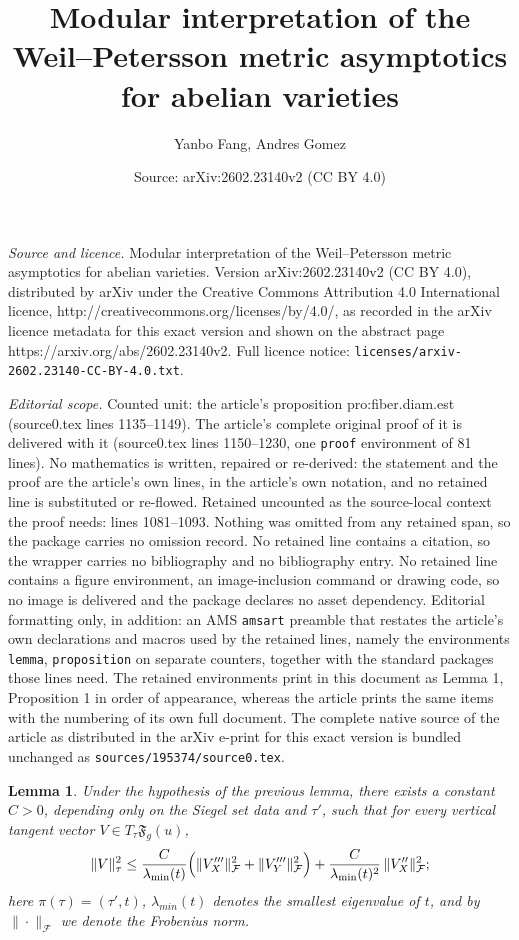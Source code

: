 \documentclass[10pt,a4paper]{amsart}
\title{Modular interpretation of the Weil--Petersson metric asymptotics for abelian varieties}
\author{Yanbo Fang, Andres Gomez}
\date{Source: arXiv:2602.23140v2 (CC BY 4.0)}
\newtheorem{lemma}{Lemma}
\newcommand{\fF}{\mathfrak{F}}
\begin{document}
\maketitle

\noindent\emph{Source and licence.} Modular interpretation of the Weil--Petersson metric asymptotics for abelian varieties. Version arXiv:2602.23140v2 (CC BY 4.0), distributed by arXiv under the Creative Commons Attribution 4.0 International licence, http://creativecommons.org/licenses/by/4.0/, as recorded in the arXiv licence metadata for this exact version and shown on the abstract page https://arxiv.org/abs/2602.23140v2. Full licence notice: \texttt{licenses/arxiv-2602.23140-CC-BY-4.0.txt}.\par\smallskip

\noindent\textit{Editorial scope.} Counted unit: the article's proposition pro:fiber.diam.est (source0.tex lines 1135--1149). The article's complete original proof of it is delivered with it (source0.tex lines 1150--1230, one \texttt{proof} environment of 81 lines). No mathematics is written, repaired or re-derived: the statement and the proof are the article's own lines, in the article's own notation, and no retained line is substituted or re-flowed.  Retained uncounted as the source-local context the proof needs: lines 1081--1093.  Nothing was omitted from any retained span, so the package carries no omission record.  No retained line contains a citation, so the wrapper carries no bibliography and no bibliography entry.  No retained line contains a figure environment, an image-inclusion command or drawing code, so no image is delivered and the package declares no asset dependency.  Editorial formatting only, in addition: an AMS \texttt{amsart} preamble that restates the article's own declarations and macros used by the retained lines, namely the environments \texttt{lemma}, \texttt{proposition} on separate counters, together with the standard packages those lines need.  The retained environments print in this document as Lemma 1, Proposition 1 in order of appearance, whereas the article prints the same items with the numbering of its own full document.  The complete native source of the article as distributed in the arXiv e-print for this exact version is bundled unchanged as \texttt{sources/195374/source0.tex}.
\begin{lemma}
\label{lem:vert.norm.est}
    Under the hypothesis of the previous lemma, there exists a constant $C>0$, depending only on the Siegel set data and $\tau'$, such that for every vertical tangent vector $V\in T_{\tau}\fF_g(u)$,
    \begin{equation}
        \label{eq:norm.est}
        \|V\|_{\tau}^2
        \le
        \frac{C}{\lambda_{\min}(t)}\Bigl(\|V_X'''\|_{\mathcal{F}}^2+\|V_Y'''\|_{\mathcal{F}}^2\Bigr)
        +
        \frac{C}{\lambda_{\min}(t)^2}\,\|V_X''\|_{\mathcal{F}}^2;
    \end{equation}
    here $\pi(\tau)=(\tau',t)$, $\lambda_{min}(t)$ denotes the smallest eigenvalue of $t$, and  by $\|\cdot\|_{\mathcal{F}}$ we denote the Frobenius norm.
\end{lemma}
\end{document}
